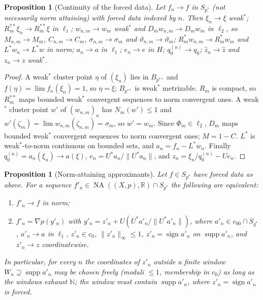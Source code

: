\documentclass[10pt]{amsart}
\newtheorem{proposition}[theorem]{Proposition}
\theoremstyle{definition}
\theoremstyle{remark}
\newcommand{\NA}{\operatorname{NA}}
\newcommand{\supp}{\operatorname{supp}}
\newcommand{\sgn}{\operatorname{sign}}
\newcommand{\R}{\mathbb R}
\newcommand{\N}{\mathbb N}
\newcommand{\zh}{\hat z}
\begin{document}
\begin{proposition}[Continuity of the forced data]\label{prop:continuity}
Let $f_n\to f$ in $S_{p^*}$ \textup{(}not necessarily norm attaining\textup{)}
with forced data indexed by $n$.  Then $\xi_n\to\xi$ weak$^*$;
$R_m^{**}\xi_n\to R_m^{**}\xi$ in $\ell_1$; $w_{n,m}\to w_m$ weak$^*$ and
$D_mw_{n,m}\to D_mw_m$ in $\ell_2$, so $M_{n,m}\to M_m$, $C_{n,m}\to C_m$,
$\sigma_{n,m}\to\sigma_m$ and $\vartheta_{n,m}\to\vartheta_m$;
$R_m^*w_{n,m}\to R_m^*w_m$ and $L^*w_n\to L^*w$ in norm; $a_n\to a$ in
$\ell_1$; $e_n\to e$ in $H$; $q_0^{(n)}\to q_0$; $\zh_n\to\zh$ and
$z_n\to z$ weak$^*$.
\end{proposition}

\begin{proof}
A weak$^*$ cluster point $\eta$ of $(\xi_n)$ lies in $B_{p^{**}}$ and
$f(\eta)=\lim f_n(\xi_n)=1$, so $\eta=\xi$; $B_{p^{**}}$ is weak$^*$
metrizable.  $R_m$ is compact, so $R_m^{**}$ maps bounded weak$^*$
convergent sequences to norm convergent ones.  A weak$^*$ cluster point
$w'$ of $(w_{n,m})_n$ has $N_m(w')\le1$ and
$w'(\zeta_m)=\lim w_{n,m}(\zeta_{n,m})=\sigma_m$, so $w'=w_m$.  Since
$\Phi_m\in\ell_2$, $D_m$ maps bounded weak$^*$ convergent sequences to
norm convergent ones; $M=1-C$.  $L^*$ is weak$^*$-to-norm continuous on
bounded sets, and $a_n=f_n-L^*w_n$.  Finally
$q_0^{(n)}=a_n(\xi_n)\to a(\xi)$, $e_n=U^*a_n/\|U^*a_n\|$, and
$z_n=\xi_n/q_0^{(n)}-Ue_n$.
\end{proof}

\begin{proposition}[Norm-attaining approximants]\label{prop:approximants}
Let $f\in S_{p^*}$ have forced data as above.  For a sequence
$f'_n\in\NA((X,p),\R)\cap S_{p^*}$ the following are equivalent:
\begin{enumerate}
\item[(i)] $f'_n\to f$ in norm;
\item[(ii)] $f'_n=\nabla p(y'_n)$ with $y'_n=z'_n+U(U^*a'_n/\|U^*a'_n\|)$,
where $a'_n\in c_{00}\cap S_{q^*}$, $a'_n\to a$ in $\ell_1$, $z'_n\in c_0$,
$\|z'_n\|_\infty\le1$, $z'_n=\sgn a'_n$ on $\supp a'_n$, and $z'_n\to z$
coordinatewise.
\end{enumerate}
In particular, for every $n$ the coordinates of $z'_n$ outside a finite
window $W_n\supseteq\supp a'_n$ may be chosen freely \textup{(}moduli
$\le1$, membership in $c_0$\textup{)} as long as the windows exhaust $\N$;
the window must contain $\supp a'_n$, where $z'_n=\sgn a'_n$ is forced.
\end{proposition}
\end{document}
